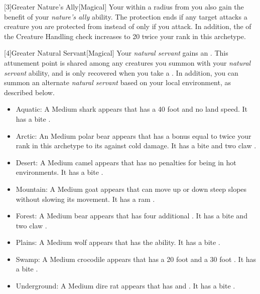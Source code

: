         [3]{Greater Nature's Ally}[Magical] Your  within a \arealarge radius  from you also gain the benefit of your \textit{nature's ally} ability.
        The protection ends if any target attacks a creature you are protected from instead of only if you attack.
        In addition, the  of the Creature Handling check increases to 20 \add twice your rank in this archetype.

        [4]{Greater Natural Servant}[Magical] Your \textit{natural servant} gains an .
        This attunement point is shared among any creatures you summon with your \textit{natural servant} ability, and is only recovered when you take a .
        In addition, you can summon an alternate \textit{natural servant} based on your local environment, as described below.
        \begin{itemize}
            \item Aquatic: A Medium shark appears that has a 40 foot  and no land speed.
                It has a bite .
            \item Arctic: An Medium polar bear appears that has a bonus equal to twice your rank in this archetype to its  against cold damage.
                It has a bite  and two claw .
            \item Desert: A Medium camel appears that has no penalties for being in hot environments.
                It has a bite .
            \item Mountain: A Medium goat appears that can move up or down steep slopes without slowing its movement.
                It has a ram .
            \item Forest: A Medium bear appears that has four additional .
                It has a bite  and two claw .
            \item Plains: A Medium wolf appears that has the  ability.
                It has a bite .
            \item Swamp: A Medium crocodile appears that has a 20 foot  and a 30 foot .
                It has a bite .
            \item Underground: A Medium dire rat appears that has  and .
                It has a bite .
        \end{itemize}

